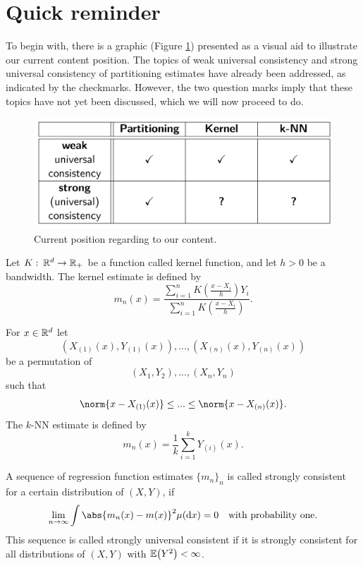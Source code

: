 \tableofcontents

\newpage

\section{Quick reminder}

To begin with, there is a graphic (Figure \ref{wherearewe}) presented as a visual aid to illustrate our current content position. The topics of weak universal consistency and strong universal consistency of partitioning estimates have already been addressed, as indicated by the checkmarks. However, the two question marks imply that these topics have not yet been discussed, which we will now proceed to do.
\begin{figure}[h] \label{wherearewe}
    \includegraphics[scale=0.12]{wherearewe.jpeg}
    \centering
    \caption{Current position regarding to our content.}
\end{figure}


\begin{definition}
    Let $K: \: \mathbb{R}^d \to \mathbb{R}_{+}$ be a function called kernel function, and let $h>0$ be a bandwidth. The kernel estimate is defined by
    \[m_n(x) = \frac{\sum_{i=1}^nK(\frac{x-X_i}{h})Y_i}{\sum_{i=1}^nK(\frac{x-X_i}{h})}.\]
\end{definition}

\begin{definition}[$k$-NN estimate]
    For $x \in \mathbb{R}^d$ let
    \[(X_{(1)}(x),Y_{(1)}(x)),...,(X_{(n)}(x),Y_{(n)}(x))\]
    be a permutation of
    \[(X_1,Y_2),...,(X_n,Y_n)\]
    such that
    \[\norm{x-X_{(1)}(x)} \leq ... \leq \norm{x-X_{(n)}(x)}.\]
    The $k$-NN estimate is defined by
    \[m_n(x) = \frac{1}{k} \sum_{i=1}^kY_{(i)}(x).\]
\end{definition}

\begin{definition}
    A sequence of regression function estimates $\{m_n\}_n$ is called strongly consistent for a certain distribution of $(X,Y)$, if
    \[\limn \int \abs{m_n(x) - m(x)}^2 \mu(\diff{x}) = 0 \quad\text{with probability one.}\]
    This sequence is called strongly universal consistent if it is strongly consistent for all distributions of $(X,Y)$ with $\mathbb{E}\!\left(Y^2\right)<\infty$.
\end{definition}

